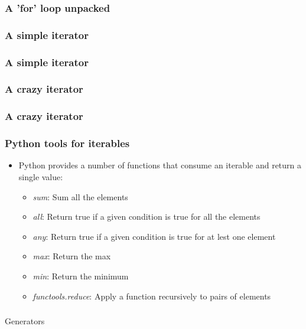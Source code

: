 \documentclass[9pt]{beamer}
\begin{document}
\begin{frame}
  \frametitle{A 'for' loop unpacked}
  
\end{frame}


\begin{frame}
  \frametitle{A simple iterator}
  
\end{frame}


\begin{frame}
  \frametitle{A simple iterator}
  
\end{frame}


\begin{frame}
  \frametitle{A crazy iterator}
  
\end{frame}


\begin{frame}
  \frametitle{A crazy iterator}
  
\end{frame}


\begin{frame}
  \frametitle{Python tools for iterables}
  \begin{itemize}
    \item Python provides a number of functions that consume an iterable and return a single value:
    \begin{itemize}
      \item \emph{sum}: Sum all the elements
      \item \emph{all}: Return true if a given condition is true for all the elements
      \item \emph{any}: Return true if a given condition is true for at lest one element
      \item \emph{max}: Return the max
      \item \emph{min}: Return the minimum
      \item \emph{functools.reduce}: Apply a function recursively to pairs of elements
    \end{itemize}
  \end{itemize}
\end{frame}


\begin{frame}
  \frametitle{}
  \centering \Large Generators
\end{frame}
\end{document}
